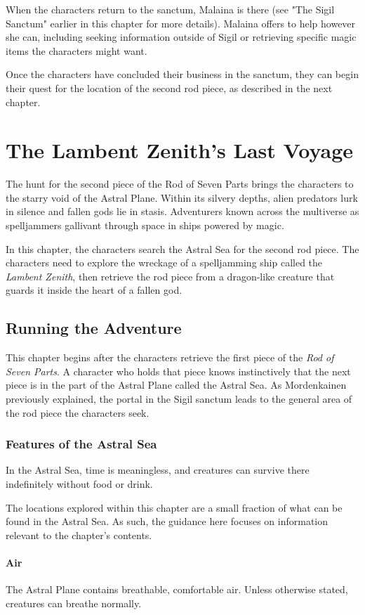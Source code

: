 \documentclass[10pt,a4paper,twoside,bg=print,twocolumn,openany,nodeprecatedcode]{dndbook}
\begin{document}
When the characters return to the sanctum, Malaina is there (see "The Sigil Sanctum" earlier in this chapter for more details). Malaina offers to help however she can, including seeking information outside of Sigil or retrieving specific magic items the characters might want.

Once the characters have concluded their business in the sanctum, they can begin their quest for the location of the second rod piece, as described in the next chapter.

\chapter{The Lambent Zenith's Last Voyage}
The hunt for the second piece of the Rod of Seven Parts brings the characters to the starry void of the Astral Plane. Within its silvery depths, alien predators lurk in silence and fallen gods lie in stasis. Adventurers known across the multiverse as spelljammers gallivant through space in ships powered by magic.

In this chapter, the characters search the Astral Sea for the second rod piece. The characters need to explore the wreckage of a spelljamming ship called the \textit{Lambent Zenith}, then retrieve the rod piece from a dragon-like creature that guards it inside the heart of a fallen god.

\section{Running the Adventure}
This chapter begins after the characters retrieve the first piece of the \textit{Rod of Seven Parts}. A character who holds that piece knows instinctively that the next piece is in the part of the Astral Plane called the Astral Sea. As Mordenkainen previously explained, the portal in the Sigil sanctum leads to the general area of the rod piece the characters seek.

\subsection{Features of the Astral Sea}
In the Astral Sea, time is meaningless, and creatures can survive there indefinitely without food or drink.

The locations explored within this chapter are a small fraction of what can be found in the Astral Sea. As such, the guidance here focuses on information relevant to the chapter's contents.

\subsubsection{Air}
The Astral Plane contains breathable, comfortable air. Unless otherwise stated, creatures can breathe normally.
\end{document}
